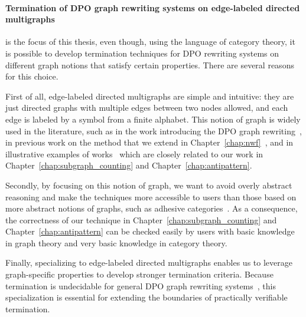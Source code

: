 \paragraph{Termination of DPO graph rewriting systems on edge-labeled directed multigraphs} is the focus of this thesis, even though, using the language of category theory, it is possible to develop termination techniques for DPO rewriting systems on different graph notions that satisfy certain properties. There are several reasons for this choice. 

First of all, edge-labeled directed multigraphs are simple and intuitive: they are just directed graphs with multiple edges between two nodes allowed, and each edge is labeled by a symbol from a finite alphabet. This notion of graph is widely used in the literature, such as in the work introducing the DPO graph rewriting~\cite{ehrig1973graph}, in previous work on the method that we extend in Chapter~\ref{chap:nwf}~\cite{bruggink2014termination,bruggink2015proving,zantema2014termination}, and in illustrative examples of works~\cite{overbeek2024termination_lmcs,endrullis2024generalized_icgt} which are closely related to our work in Chapter~\ref{chap:subgraph_counting} and Chapter~\ref{chap:antipattern}.

 Secondly, by focusing on this notion of graph, we want to avoid overly abstract reasoning and make the techniques more accessible to users than those based on more abstract notions of graphs, such as adhesive categories~\cite{lack2004adhesive}.
 As a consequence, the correctness of our technique in Chapter~\ref{chap:subgraph_counting} and Chapter~\ref{chap:antipattern} can be checked easily by users with basic knowledge in graph theory and very basic knowledge in category theory.

Finally, specializing to edge-labeled directed multigraphs enables us to leverage graph-specific properties to develop stronger termination criteria. Because termination is undecidable for general DPO graph rewriting systems~\cite{plump1998terminationundecidable}, this specialization is essential for extending the boundaries of practically verifiable termination. 

 
